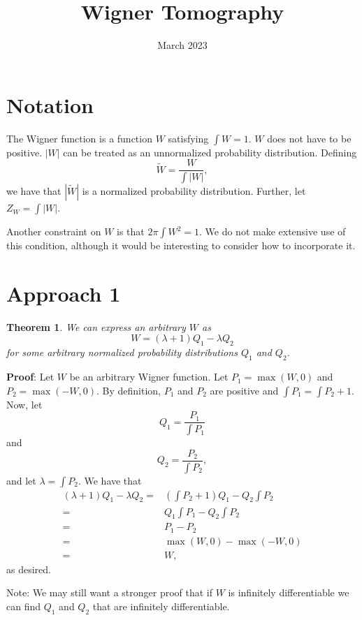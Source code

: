 \documentclass{article}
\title{Wigner Tomography}
\date{March 2023}
\newtheorem{theorem}{Theorem}
\begin{document}
\maketitle

\section{Notation}

The Wigner function is a function $W$ satisfying $\int W = 1$. $W$ does not have to be positive. $|W|$ can be treated as an unnormalized probability distribution. Defining \[\widetilde{W} = \frac{W}{\int |W|},\] we have that $|\widetilde{W}|$ is a normalized probability distribution. Further, let $Z_W = \int |W|$.

Another constraint on $W$ is that $2\pi\int W^2 = 1$. We do not make extensive use of this condition, although it would be interesting to consider how to incorporate it.

\section{Approach 1}

\begin{theorem}
    We can express an arbitrary $W$ as \[W = (\lambda+1)Q_1-\lambda Q_2\] for some arbitrary normalized probability distributions $Q_1$ and $Q_2$.
\end{theorem}\textbf{Proof}: Let $W$ be an arbitrary Wigner function. Let $P_1 = \max(W,0)$ and $P_2 = \max(-W,0)$. By definition, $P_1$ and $P_2$ are positive and $\int P_1 = \int P_2 + 1$. Now, let \[Q_1 = \frac{P_1}{\int P_1}\] and \[Q_2 = \frac{P_2}{\int P_2},\] and let $\lambda = \int P_2$. We have that \begin{align*}
    (\lambda + 1) Q_1 - \lambda Q_2=&\left(\int P_2 + 1\right) Q_1 - Q_2 \int P_2\\
    =&Q_1\int P_1 - Q_2 \int P_2\\
    =&P_1 - P_2\\
    =&\max(W,0) - \max(-W,0)\\
    =&W,
\end{align*} as desired.

Note: We may still want a stronger proof that if $W$ is infinitely differentiable we can find $Q_1$ and $Q_2$ that are infinitely differentiable.
\end{document}
